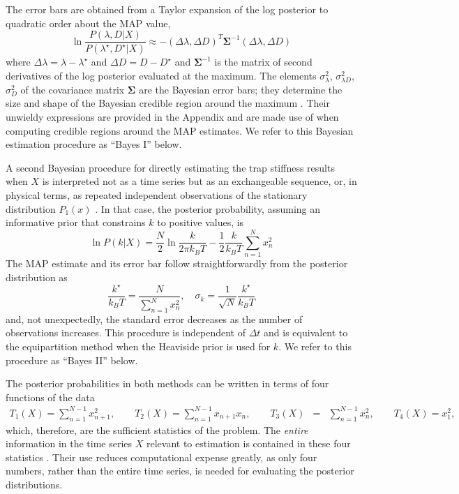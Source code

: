 \documentclass[fleqn,10pt]{wlscirep}
\begin{document}
The error bars are obtained from a Taylor expansion of the log posterior
to quadratic order about the MAP value,
\begin{equation}
\ln\frac{P(\lambda,D|X)}{P(\lambda^{\star},D^{\star}|X)}\approx-\left(\Delta\lambda,\Delta D\right)^{T}\mathbf{\boldsymbol{\Sigma}}^{-1}\left(\Delta\lambda,\Delta D\right)\label{eq:quadratic-form}
\end{equation}
where $\Delta\lambda=\lambda-\lambda^{\star}$ and $\Delta D=D-D^{\star}$
and $\boldsymbol{\Sigma}^{-1}$ is the matrix of second derivatives
of the log posterior evaluated at the maximum. The elements $\sigma_{\lambda}^{2}$,
$\sigma_{\lambda D}^{2}$, $\sigma_{D}^{2}$ of the covariance matrix
$\boldsymbol{\Sigma}$ are the Bayesian error bars; they determine
the size and shape of the Bayesian credible region around the maximum
\cite{sivia2006data}. Their unwieldy expressions are provided in
the Appendix and are made use of when computing credible regions around
the MAP estimates. We refer to this Bayesian estimation procedure
as ``Bayes I'' below. 

A second Bayesian procedure for directly estimating the trap stiffness
results when $X$ is interpreted not as a time series but as an exchangeable
sequence, or, in physical terms, as repeated independent observations
of the stationary distribution $P_{1}(x)$ \cite{jaynes2003probability}.
In that case, the posterior probability, assuming an informative prior
that constrains $k$ to positive values, is
\begin{equation}
\ln P(k|X)=\frac{N}{2}\ln\frac{k}{2\pi k_{B}T}-\frac{1}{2}\frac{k}{k_{B}T}\sum_{n=1}^{N}x_{n}^{2}\label{eq:k-posterior}
\end{equation}
The MAP estimate and its error bar follow straightforwardly from the
posterior distribution as
\begin{equation}
\frac{k^{\star}}{k_{B}T}=\frac{N}{\sum_{n=1}^{N}x_{n}^{2}},\quad\sigma_{k}=\frac{1}{\sqrt{N}}\frac{k^{\star}}{k_{B}T}\label{eq:k-map}
\end{equation}
and, not unexpectedly, the standard error decreases as the number
of observations increases. This procedure is independent of $\Delta t$
and is equivalent to the equipartition method when the Heaviside prior
is used for $k$. We refer to this procedure as ``Bayes II'' below.

The posterior probabilities in both methods can be written in terms
of four functions of the data
\begin{eqnarray}
T_{1}(X)=\sum_{n=1}^{N-1}x_{n+1}^{2},\qquad T_{2}(X)=\sum_{n=1}^{N-1}x_{n+1}x_{n},\qquad T_{3}(X) & = & \sum_{n=1}^{N-1}x_{n}^{2},\qquad T_{4}(X)=x_{1}^{2},
\end{eqnarray}
which, therefore, are the sufficient statistics of the problem. The
\emph{entire} information in the time series $X$ relevant to estimation
is contained in these four statistics \cite{jaynes2003probability}.
Their use reduces computational expense greatly, as only four numbers,
rather than the entire time series, is needed for evaluating the posterior
distributions.
\end{document}
